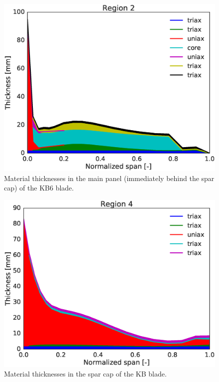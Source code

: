 \begin{figure}[!ht]
\begin{center}
	\includegraphics[width=.85\linewidth]{figures/KB6_laminate_layers_r02.eps}
\end{center}
\caption{Material thicknesses in the main panel (immediately behind the spar cap) of the KB6 blade.}
\label{fig:KB6matstackr02}
\end{figure}

\begin{figure}[!ht]
\begin{center}
	\includegraphics[width=.85\linewidth]{figures/KB6_laminate_layers_r04.eps}
\end{center}
\caption{Material thicknesses in the spar cap of the KB blade.}
\label{fig:KB6matstackr04}
\end{figure}

